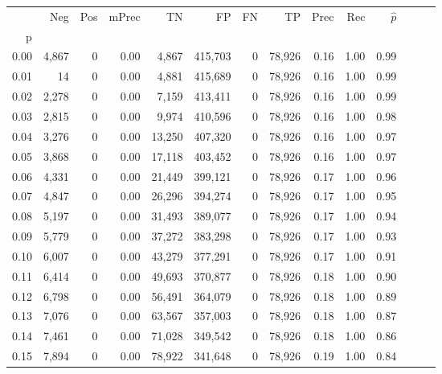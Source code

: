 \begin{tabular}{rrrrrrrrrrrrrr}
\toprule
{} &    Neg &    Pos & mPrec &       TN &       FP &      FN &      TP &  Prec &   Rec & $\hat{p}$ \\
p    &        &        &       &          &          &         &         &       &       &           \\
\midrule
0.00 &  4,867 &      0 &  0.00 &    4,867 &  415,703 &       0 &  78,926 &  0.16 &  1.00 &      0.99 \\
0.01 &     14 &      0 &  0.00 &    4,881 &  415,689 &       0 &  78,926 &  0.16 &  1.00 &      0.99 \\
0.02 &  2,278 &      0 &  0.00 &    7,159 &  413,411 &       0 &  78,926 &  0.16 &  1.00 &      0.99 \\
0.03 &  2,815 &      0 &  0.00 &    9,974 &  410,596 &       0 &  78,926 &  0.16 &  1.00 &      0.98 \\
0.04 &  3,276 &      0 &  0.00 &   13,250 &  407,320 &       0 &  78,926 &  0.16 &  1.00 &      0.97 \\
0.05 &  3,868 &      0 &  0.00 &   17,118 &  403,452 &       0 &  78,926 &  0.16 &  1.00 &      0.97 \\
0.06 &  4,331 &      0 &  0.00 &   21,449 &  399,121 &       0 &  78,926 &  0.17 &  1.00 &      0.96 \\
0.07 &  4,847 &      0 &  0.00 &   26,296 &  394,274 &       0 &  78,926 &  0.17 &  1.00 &      0.95 \\
0.08 &  5,197 &      0 &  0.00 &   31,493 &  389,077 &       0 &  78,926 &  0.17 &  1.00 &      0.94 \\
0.09 &  5,779 &      0 &  0.00 &   37,272 &  383,298 &       0 &  78,926 &  0.17 &  1.00 &      0.93 \\
0.10 &  6,007 &      0 &  0.00 &   43,279 &  377,291 &       0 &  78,926 &  0.17 &  1.00 &      0.91 \\
0.11 &  6,414 &      0 &  0.00 &   49,693 &  370,877 &       0 &  78,926 &  0.18 &  1.00 &      0.90 \\
0.12 &  6,798 &      0 &  0.00 &   56,491 &  364,079 &       0 &  78,926 &  0.18 &  1.00 &      0.89 \\
0.13 &  7,076 &      0 &  0.00 &   63,567 &  357,003 &       0 &  78,926 &  0.18 &  1.00 &      0.87 \\
0.14 &  7,461 &      0 &  0.00 &   71,028 &  349,542 &       0 &  78,926 &  0.18 &  1.00 &      0.86 \\
0.15 &  7,894 &      0 &  0.00 &   78,922 &  341,648 &       0 &  78,926 &  0.19 &  1.00 &      0.84 \\

\end{tabular}
